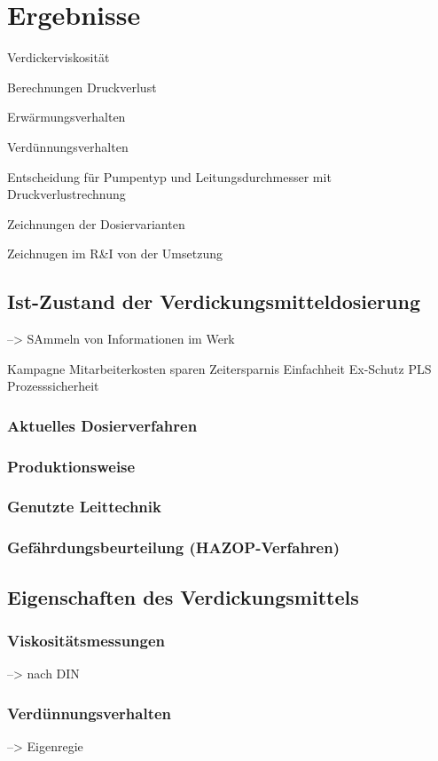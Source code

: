 \section{Ergebnisse}
\label{sec:ergebnisse}

Verdickerviskosität

Berechnungen Druckverlust

Erwärmungsverhalten

Verdünnungsverhalten

Entscheidung für Pumpentyp und Leitungsdurchmesser mit Druckverlustrechnung 

Zeichnungen der Dosiervarianten

Zeichnugen im R\&I von der Umsetzung


\subsection{Ist-Zustand der Verdickungsmitteldosierung}
--> SAmmeln von Informationen im Werk

Kampagne
Mitarbeiterkosten sparen
Zeitersparnis
Einfachheit
Ex-Schutz
PLS
Prozesssicherheit

\subsubsection{Aktuelles Dosierverfahren}
\subsubsection{Produktionsweise}
\subsubsection{Genutzte Leittechnik}
\subsubsection{Gefährdungsbeurteilung (HAZOP-Verfahren)}

\subsection{Eigenschaften des Verdickungsmittels}

\subsubsection{Viskositätsmessungen}
--> nach DIN

\subsubsection{Verdünnungsverhalten}
--> Eigenregie

